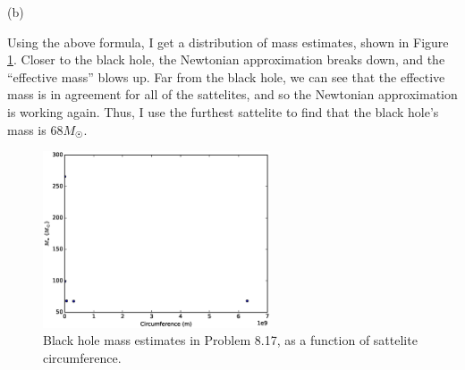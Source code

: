 \documentclass[gr-notes.tex]{subfiles}
\begin{document}
(b)

Using the above formula, I get a distribution of mass estimates, shown in Figure \ref{fig:ch8-problem17b}. Closer to the black hole, the Newtonian approximation breaks down, and the ``effective mass'' blows up. Far from the black hole, we can see that the effective mass is in agreement for all of the sattelites, and so the Newtonian approximation is working again. Thus, I use the furthest sattelite to find that the black hole's mass is $68 M_\Sun$.

\begin{figure}[ht]
  \centering
  \includegraphics[width=0.6\textwidth]{img/ch8_problem_17b}
  \caption{Black hole mass estimates in Problem 8.17, as a function of sattelite circumference.}
  \label{fig:ch8-problem17b}
\end{figure}
\end{document}
